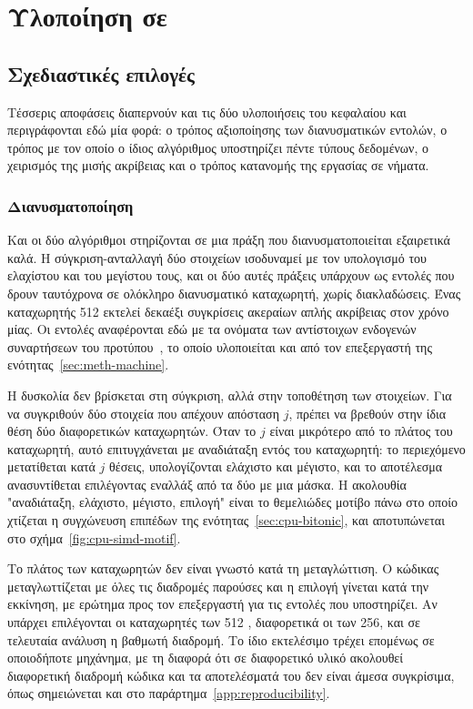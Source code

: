 \chapter{Υλοποίηση σε }
\label{ch:cpu}

\section{Σχεδιαστικές επιλογές}
\label{sec:cpu-design}

Τέσσερις αποφάσεις διαπερνούν και τις δύο υλοποιήσεις του κεφαλαίου και
περιγράφονται εδώ μία φορά: ο τρόπος αξιοποίησης των διανυσματικών εντολών, ο
τρόπος με τον οποίο ο ίδιος αλγόριθμος υποστηρίζει πέντε τύπους δεδομένων, ο
χειρισμός της μισής ακρίβειας και ο τρόπος κατανομής της εργασίας σε νήματα.

\subsection{Διανυσματοποίηση}
\label{sec:cpu-simd}

Και οι δύο αλγόριθμοι στηρίζονται σε μια πράξη που διανυσματοποιείται εξαιρετικά
καλά. Η σύγκριση-ανταλλαγή δύο στοιχείων ισοδυναμεί με τον υπολογισμό του
ελαχίστου και του μεγίστου τους, και οι δύο αυτές πράξεις υπάρχουν ως εντολές
που δρουν ταυτόχρονα σε ολόκληρο διανυσματικό καταχωρητή, χωρίς διακλαδώσεις.
Ένας καταχωρητής 512  εκτελεί δεκαέξι συγκρίσεις ακεραίων απλής
ακρίβειας στον χρόνο μίας. Οι εντολές αναφέρονται εδώ με τα ονόματα των
αντίστοιχων ενδογενών συναρτήσεων του προτύπου~\cite{intelintrinsics}, το οποίο
υλοποιείται και από τον επεξεργαστή της ενότητας~\ref{sec:meth-machine}.

Η δυσκολία δεν βρίσκεται στη σύγκριση, αλλά στην τοποθέτηση των στοιχείων. Για να
συγκριθούν δύο στοιχεία που απέχουν απόσταση $j$, πρέπει να βρεθούν στην ίδια
θέση δύο διαφορετικών καταχωρητών. Όταν το $j$ είναι μικρότερο από το πλάτος του
καταχωρητή, αυτό επιτυγχάνεται με αναδιάταξη εντός του καταχωρητή: το περιεχόμενο
μετατίθεται κατά $j$ θέσεις, υπολογίζονται ελάχιστο και μέγιστο, και το
αποτέλεσμα ανασυντίθεται επιλέγοντας εναλλάξ από τα δύο με μια μάσκα. Η
ακολουθία "αναδιάταξη, ελάχιστο, μέγιστο, επιλογή" είναι το θεμελιώδες μοτίβο πάνω
στο οποίο χτίζεται η συγχώνευση επιπέδων της ενότητας~\ref{sec:cpu-bitonic}, και
αποτυπώνεται στο σχήμα~\ref{fig:cpu-simd-motif}.



Το πλάτος των καταχωρητών δεν είναι γνωστό κατά τη μεταγλώττιση. Ο κώδικας
μεταγλωττίζεται με όλες τις διαδρομές παρούσες και η επιλογή γίνεται κατά την
εκκίνηση, με ερώτημα προς τον επεξεργαστή για τις εντολές που υποστηρίζει. Αν
υπάρχει  επιλέγονται οι καταχωρητές των 512 , διαφορετικά οι
των 256, και σε τελευταία ανάλυση η βαθμωτή διαδρομή. Το ίδιο εκτελέσιμο τρέχει
επομένως σε οποιοδήποτε μηχάνημα, με τη διαφορά ότι σε διαφορετικό υλικό
ακολουθεί διαφορετική διαδρομή κώδικα και τα αποτελέσματά του δεν είναι άμεσα
συγκρίσιμα, όπως σημειώνεται και στο παράρτημα~\ref{app:reproducibility}.


